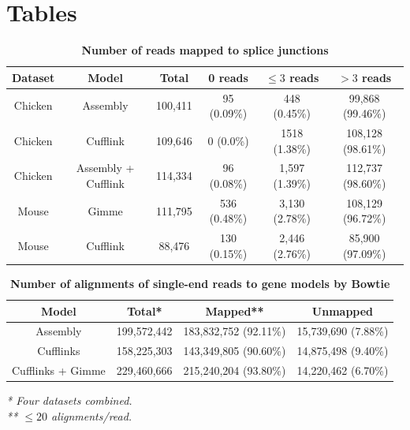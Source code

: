 \documentclass[10pt]{article}
\begin{document}
\section*{Tables}
\begin{table}[!ht]
\caption{
\bf{Number of reads mapped to splice junctions}}
\begin{tabular}{cccccc}
\hline
Dataset & Model & Total & 0 reads& $\le3$ reads & $>3$ reads \\ 
\hline
Chicken & Assembly & 100,411 & 95 (0.09\%) & 448 (0.45\%) & 99,868 (99.46\%) \\
Chicken & Cufflink & 109,646 & 0 (0.0\%) & 1518 (1.38\%) & 108,128 (98.61\%) \\
Chicken & Assembly + Cufflink & 114,334 & 96 (0.08\%) & 1,597 (1.39\%) & 112,737 (98.60\%) \\
Mouse & Gimme & 111,795 & 536 (0.48\%) & 3,130 (2.78\%) & 108,129 (96.72\%) \\
Mouse & Cufflink & 88,476 & 130 (0.15\%) & 2,446 (2.76\%) & 85,900 (97.09\%) \\
\hline
\end{tabular}
\label{junction_read}

\end{table}

\begin{table}[!ht]
\caption{
\bf{Number of alignments of single-end reads to gene models by Bowtie}}
\begin{tabular}{cccc}
\hline
Model & Total* & Mapped** & Unmapped \\ 
\hline
Assembly & 199,572,442 & 183,832,752 (92.11\%) & 15,739,690 (7.88\%) \\
Cufflinks & 158,225,303 & 143,349,805 (90.60\%)& 14,875,498 (9.40\%) \\
Cufflinks + Gimme & 229,460,666 & 215,240,204 (93.80\%)& 14,220,462 (6.70\%) \\
\hline
\end{tabular}
\begin{flushleft}\footnotesize \textit{* Four datasets combined.\\
** $\le20$ alignments/read.}
\end{flushleft}
\label{junction_read}
\end{table}
\end{document}
